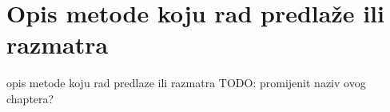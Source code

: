 \chapter{Opis metode koju rad predlaže ili razmatra}

opis metode koju rad predlaze ili razmatra
TODO: promijenit naziv ovog chaptera?